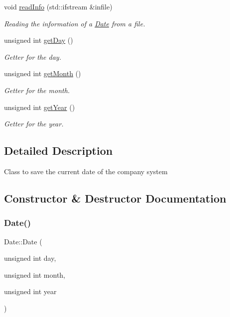 \begin{DoxyCompactItemize}
void \mbox{\hyperlink{class_date_ad23dffa000ed62018a399c519acb06db}{read\+Info}} (std\+::ifstream \&infile)
\begin{DoxyCompactList}\small\item\em Reading the information of a \mbox{\hyperlink{class_date}{Date}} from a file. \end{DoxyCompactList}\item 
unsigned int \mbox{\hyperlink{class_date_ab39b571a45cbcdfd37b23c28801fa7b0}{get\+Day}} ()
\begin{DoxyCompactList}\small\item\em Getter for the day. \end{DoxyCompactList}\item 
unsigned int \mbox{\hyperlink{class_date_a9efc6db1870de82dbd717f1c3c782f82}{get\+Month}} ()
\begin{DoxyCompactList}\small\item\em Getter for the month. \end{DoxyCompactList}\item 
unsigned int \mbox{\hyperlink{class_date_a90be6a509b91ee9addfeec0e68b965e2}{get\+Year}} ()
\begin{DoxyCompactList}\small\item\em Getter for the year. \end{DoxyCompactList}\end{DoxyCompactItemize}


\subsection{Detailed Description}
Class to save the current date of the company system 

\subsection{Constructor \& Destructor Documentation}
\mbox{\label{class_date_a28c6604a0f8ed8216becf24abc20cf5b}} 
\subsubsection{\texorpdfstring{Date()}{Date()}}
{\footnotesize\ttfamily Date\+::\+Date (\begin{DoxyParamCaption}\item[{unsigned int}]{day,  }\item[{unsigned int}]{month,  }\item[{unsigned int}]{year }\end{DoxyParamCaption})}



